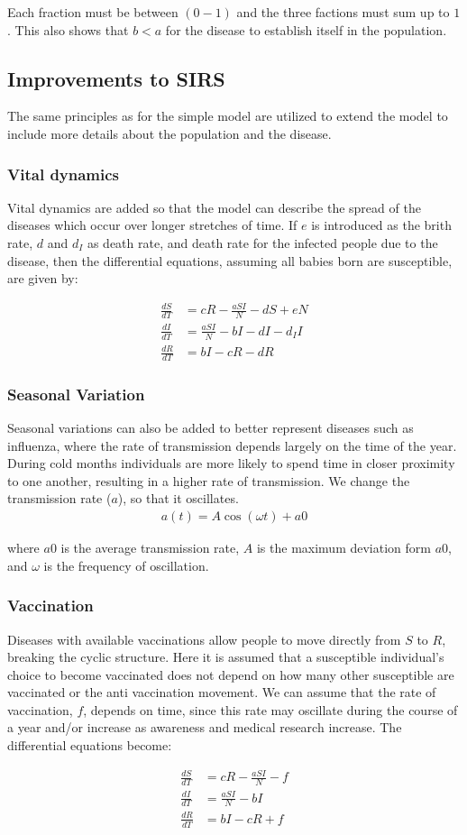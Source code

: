 Each fraction must be between $(0-1)$ and the three factions must sum up to $1$. This also shows that $b < a$ for the disease to establish itself in the population.

\subsection{Improvements to SIRS}
The same principles as for the simple model are utilized to extend the model to include more details about the population and the disease. 

\subsubsection{Vital dynamics}\label{sec:VD}
Vital dynamics are added so that the model can describe the spread of the diseases which occur over longer stretches of time. If $e$ is introduced as the brith rate, $d$ and $d_I$ as death rate, and death rate for the infected people due to the disease, then the differential equations, assuming all babies born are susceptible, are given by:

\begin{align}
\frac{dS}{dT} &= cR - \frac{aSI}{N} - dS + eN\\
\frac{dI}{dT} &= \frac{aSI}{N} - bI - dI - d_I I\\
\frac{dR}{dT} &= bI - cR - dR
\end{align} 

\subsubsection{Seasonal Variation}\label{sec:SV}
Seasonal variations can also be added to better represent diseases such as influenza, where the rate of transmission depends largely on the time of the year. During cold months individuals are more likely to spend time in closer proximity to one another, resulting in a higher rate of transmission. We change the transmission rate ($a$), so that it oscillates.
\begin{align}
a(t) = A\cos (\omega t) + a0
\end{align} 

where $a0$ is the average transmission rate, $A$ is the maximum deviation form $a0$, and $\omega$ is the frequency of oscillation.

\subsubsection{Vaccination}
Diseases with available vaccinations allow people to move directly from $S$ to $R$, breaking the cyclic structure.\autocite{zaman2008stability} Here it is assumed that a susceptible individual's choice to become vaccinated does not depend on how many other susceptible are vaccinated or the anti vaccination movement. We can assume that the rate of vaccination, $f$, depends on time, since this rate may oscillate during the course of a year and/or increase as awareness and medical research increase. The differential equations become:

\begin{align}
\frac{dS}{dT} &= cR - \frac{aSI}{N} -f\\
\frac{dI}{dT} &= \frac{aSI}{N} - bI \\
\frac{dR}{dT} &= bI - cR + f
\end{align}



